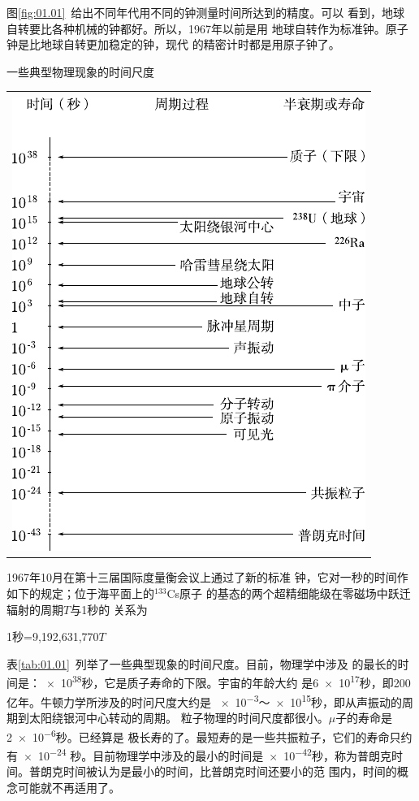 图\ref{fig:01.01}~给出不同年代用不同的钟测量时间所达到的精度。可以
看到，地球自转要比各种机械的钟都好。所以，1967年以前是用
地球自转作为标准钟。原子钟是比地球自转更加稳定的钟，现代
的精密计时都是用原子钟了。

\begin{tablex}[!h]{2.5em}
    \centering
    \caption{一些典型物理现象的时间尺度}
    \label{tab:01.01}
    \begin{tabular}{c}
        \toprule \vspace{-1em}                                     \\
        \includegraphics[width=0.8\linewidth]{figure/tab01.01} \\
        \bottomrule
    \end{tabular}
\end{tablex}
\clearpage
1967年10月在第十三届国际度量衡会议上通过了新的标准
钟，它对一秒的时间作如下的规定；位于海平面上的$^{133}$Cs原子
的基态的两个超精细能级在零磁场中跃迁辐射的周期$T$与1秒的
关系为

\centerline{1秒=9,192,631,770$T$}

表\ref{tab:01.01}~列举了一些典型现象的时间尺度。目前，物理学中涉及
的最长的时间是：\num{e38}秒，它是质子寿命的下限。宇宙的年龄大约
是\num{6e17}秒，即200亿年。牛顿力学所涉及的时问尺度大约是
\num{e-3}～\num{e15}秒，即从声振动的周期到太阳绕银河中心转动的周期。
粒子物理的时间尺度都很小。$\mu$子的寿命是\num{2e-6}秒。已经算是
极长寿的了。最短寿的是一些共振粒子，它们的寿命只约有\num{e-24}
秒。目前物理学中涉及的最小的时间是\num{e-42}秒，称为普朗克时
间。普朗克时间被认为是最小的时间，比普朗克时间还要小的范
围内，时间的概念可能就不再适用了。